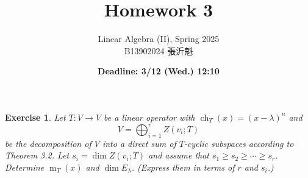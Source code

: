 \documentclass[a4paper]{article}
\theoremstyle{mystyle}
\newtheorem{exercise}[theorem]{Exercise}
\newcommand{\6}{\partial}
\DeclareMathOperator{\ch}{ch}
\DeclareMathOperator{\m}{m}
\begin{document}
\title{\textbf{Homework 3}}
\author{Linear Algebra (II), Spring 2025 \\ B13902024 張沂魁}
\date{\textbf{Deadline: 3/12 (Wed.) 12:10}}
\maketitle

\begin{exercise}
    Let $T:V\to V$ be a linear operator with
    $\ch_T(x)=(x-\lambda)^n$ and
    $$
    V=\bigoplus_{i=1}^rZ(v_i;T)
    $$
    be the decomposition of $V$ into a direct sum of $T$-cyclic subspaces according to Theorem 3.2. Let $s_i=\dim Z(v_i;T)$ and assume that $s_1\geq s_2\geq\cdots\geq s_r$. Determine $\m_T(x)$ and $\dim E_\lambda$. (Express them in terms of $r$ and $s_i$.)
\end{exercise}
\end{document}
